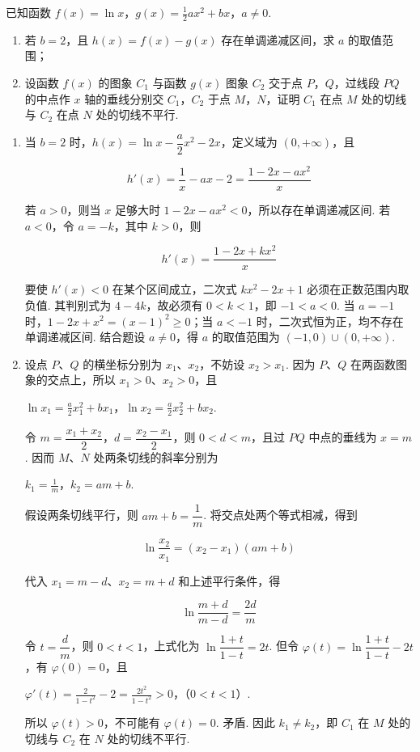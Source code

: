 \begin{problem}
已知函数 \(f(x) = \ln x\)，\(g(x) = \frac{1}{2} ax^2 + bx\)，\(a \neq 0\).

\begin{enumerate}
\item 若 \(b = 2\)，且 \(h(x) = f(x) - g(x)\) 存在单调递减区间，求 \(a\) 的取值范围；
\item 设函数 \(f(x)\) 的图象 \(C_1\) 与函数 \(g(x)\) 图象 \(C_2\) 交于点 \(P\)，\(Q\)，过线段 \(PQ\) 的中点作 \(x\) 轴的垂线分别交 \(C_1\)，\(C_2\) 于点 \(M\)，\(N\)，证明 \(C_1\) 在点 \(M\) 处的切线与 \(C_2\) 在点 \(N\) 处的切线不平行.
\end{enumerate}

\begin{solution}
\begin{enumerate}
\item 当 \(b=2\) 时，\(h(x)=\ln x-\dfrac{a}{2}x^{2}-2x\)，定义域为 \((0,+\infty)\)，且

\[
h'(x)=\frac{1}{x}-ax-2=\frac{1-2x-ax^{2}}{x}
\]

若 \(a>0\)，则当 \(x\) 足够大时 \(1-2x-ax^{2}<0\)，所以存在单调递减区间. 若 \(a<0\)，令 \(a=-k\)，其中 \(k>0\)，则

\[
h'(x)=\frac{1-2x+kx^{2}}{x}
\]

要使 \(h'(x)<0\) 在某个区间成立，二次式 \(kx^{2}-2x+1\) 必须在正数范围内取负值. 其判别式为 \(4-4k\)，故必须有 \(0<k<1\)，即 \(-1<a<0\). 当 \(a=-1\) 时，\(1-2x+x^{2}=(x-1)^{2}\geqslant0\)；当 \(a<-1\) 时，二次式恒为正，均不存在单调递减区间. 结合题设 \(a\neq0\)，得 \(a\) 的取值范围为 \((-1,0)\cup(0,+\infty)\).

\item 设点 \(P\)、\(Q\) 的横坐标分别为 \(x_1\)、\(x_2\)，不妨设 \(x_2>x_1\). 因为 \(P\)、\(Q\) 在两函数图象的交点上，所以 \(x_1>0\)、\(x_2>0\)，且

\(\ln x_1=\frac{a}{2}x_1^{2}+bx_1\)，\(\ln x_2=\frac{a}{2}x_2^{2}+bx_2\).

令 \(m=\dfrac{x_1+x_2}{2}\)，\(d=\dfrac{x_2-x_1}{2}\)，则 \(0<d<m\)，且过 \(PQ\) 中点的垂线为 \(x=m\). 因而 \(M\)、\(N\) 处两条切线的斜率分别为

\(k_1=\frac{1}{m}\)，\(k_2=am+b\).

假设两条切线平行，则 \(am+b=\dfrac{1}{m}\). 将交点处两个等式相减，得到

\[
\ln\frac{x_2}{x_1}=(x_2-x_1)(am+b)
\]

代入 \(x_1=m-d\)、\(x_2=m+d\) 和上述平行条件，得

\[
\ln\frac{m+d}{m-d}=\frac{2d}{m}
\]

令 \(t=\dfrac{d}{m}\)，则 \(0<t<1\)，上式化为 \(\ln\dfrac{1+t}{1-t}=2t\). 但令 \(\varphi(t)=\ln\dfrac{1+t}{1-t}-2t\)，有 \(\varphi(0)=0\)，且

\(\varphi'(t)=\frac{2}{1-t^{2}}-2=\frac{2t^{2}}{1-t^{2}}>0\)，（\(0<t<1\)）.

所以 \(\varphi(t)>0\)，不可能有 \(\varphi(t)=0\). 矛盾. 因此 \(k_1\neq k_2\)，即 \(C_1\) 在 \(M\) 处的切线与 \(C_2\) 在 \(N\) 处的切线不平行.
\end{enumerate}
\end{solution}
\end{problem}
